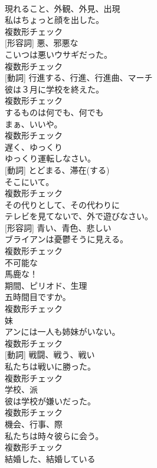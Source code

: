 \documentclass[8pt]{extreport}
\begin{document}
\begin{CJK}{UTF8}{min}
\\	[名詞]	現れること、外観、外見、出現	
\\	私はちょっと顔を出した。	
\\	複数形チェック
\\	[名詞] [形容詞]	悪、邪悪な	
\\	こいつは悪いウサギだった。	
\\	複数形チェック
\\	[名詞] [動詞]	行進する、行進、行進曲、マーチ	
\\	彼は３月に学校を終えた。	
\\	複数形チェック
\\	[代名詞]	するものは何でも、何でも	
\\	まぁ、いいや。	
\\	複数形チェック
\\	[副詞]	遅く、ゆっくり	
\\	ゆっくり運転しなさい。	
\\	[名詞] [動詞]	とどまる、滞在(する)	
\\	そこにいて。	
\\	複数形チェック
\\	[副詞]	その代りとして、その代わりに	
\\	テレビを見てないで、外で遊びなさい。	
\\	[名詞] [形容詞]	青い、青色、悲しい	
\\	ブライアンは憂鬱そうに見える。	
\\	複数形チェック
\\	[形容詞]	不可能な	
\\	馬鹿な！	
\\	[名詞]	期間、ピリオド、生理	
\\	五時間目ですか。	
\\	複数形チェック
\\	[名詞]	妹	
\\	アンには一人も姉妹がいない。	
\\	複数形チェック
\\	[名詞] [動詞]	戦闘、戦う、戦い	
\\	私たちは戦いに勝った。	
\\	複数形チェック
\\	[名詞]	学校、派	
\\	彼は学校が嫌いだった。	
\\	複数形チェック
\\	[名詞]	機会、行事、際	
\\	私たちは時々彼らに会う。	
\\	複数形チェック
\\	[形容詞]	結婚した、結婚している	

\end{CJK}
\end{document}
